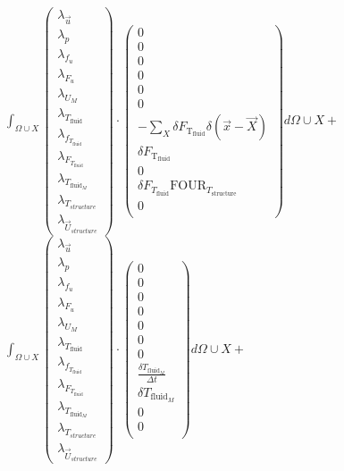 \documentclass[10pt]{article} %
\begin{document}
\begin{center}
	$\int_{\Omega \cup X}
	\begin{pmatrix}
		\lambda_{\vec{u}} \\ \lambda_p \\ \lambda_{f_u} \\ \lambda_{F_u} \\ \lambda_{U_M}\\ \lambda_{T_{\text{fluid}}} \\ \lambda_{f_{T_{\text{fluid}}}} \\ \lambda_{F_{T_{\text{fluid}}}} \\ \lambda_{T_{\text{fluid}_M}} \\ \lambda_{T_{structure}} \\ \lambda_{\vec{U}_{structure}}
	\end{pmatrix}
	\cdot
	\begin{pmatrix}
		0 \\
		0\\
		0 \\
		0 \\
		0 \\
		0 \\
		-\sum_X \delta F_{\text{T}_{\text{fluid}}} \delta (\vec{x}-\vec{X}) \\
		\delta F_{\text{T}_{\text{fluid}}}\\
		0\\
		\delta F_{T_{\text{fluid}}} \text{FOUR}_{T_{\text{structure}}}\\
		0\\
	\end{pmatrix}
	d\Omega \cup X + $\\

	$\int_{\Omega \cup X}
	\begin{pmatrix}
		\lambda_{\vec{u}} \\ \lambda_p \\ \lambda_{f_u} \\ \lambda_{F_u} \\ \lambda_{U_M}\\ \lambda_{T_{\text{fluid}}} \\ \lambda_{f_{T_{\text{fluid}}}} \\ \lambda_{F_{T_{\text{fluid}}}} \\ \lambda_{T_{\text{fluid}_M}} \\ \lambda_{T_{structure}} \\ \lambda_{\vec{U}_{structure}}
	\end{pmatrix}
	\cdot
	\begin{pmatrix}
		0\\
		0\\
		0 \\
		0\\
		0 \\
		0\\
		0\\
		\frac{\delta T_{\text{fluid}_M}}{\Delta t}\\
		\delta T_{\text{fluid}_M}\\
		0\\
		0\\
	\end{pmatrix}
	d\Omega \cup X +$\\
	

\end{center}
\end{document}
